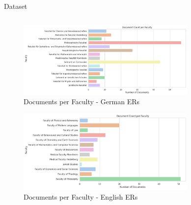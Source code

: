 \documentclass{beamer}
\begin{document}
\begin{frame}{Dataset}
  \begin{columns}
    \begin{column}{.5\textwidth}
      \begin{figure}
        \includegraphics[width=0.9\textwidth]{Grafiken/PO_german_Document Count per Faculty.png}
        \caption{Documents per Faculty - German ERs}
      \end{figure}
      \begin{figure}
        \includegraphics[width=0.9\textwidth]{Grafiken/PO_english_Document Count per Faculty.png}
        \caption{Documents per Faculty - English ERs}
      \end{figure}
    \end{column}
    \begin{column}{.5\textwidth}
      \begin{figure}

\end{figure}
\end{column}
\end{columns}
\end{frame}
\end{document}
